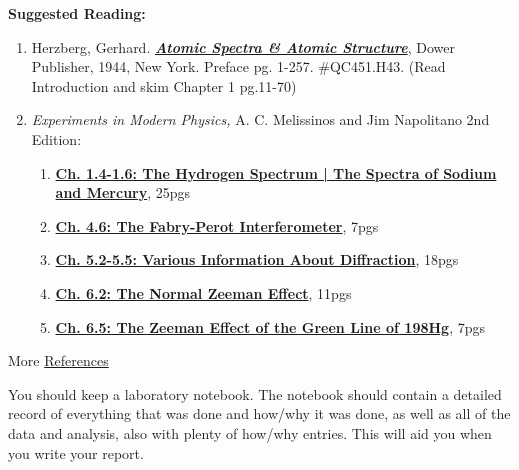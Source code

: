 \documentclass{../lab}
\begin{document}
\noindent\textbf{Suggested Reading:}

\begin{enumerate}
    \item Herzberg, Gerhard. \emph{\href{https://drive.google.com/file/d/1WSyJRwUKQZkj335oLa1WTh3_NwQC4f2T/view?usp=drive_link}{\textbf{Atomic Spectra \& Atomic Structure}}}, Dower Publisher, 1944, New York. Preface pg. 1-257. \#QC451.H43. (Read Introduction and skim Chapter 1 pg.11-70)


    \item\emph{Experiments in Modern Physics,} A. C. Melissinos and Jim Napolitano 2nd Edition:
    
    \begin{enumerate}
        \item \href{https://drive.google.com/file/d/18QFC_Op-xii8O3NMuTpigmJulkBVi6Rb/view?usp=drive_link}{\textbf{Ch. 1.4-1.6: The Hydrogen Spectrum | The Spectra of Sodium and Mercury}}, 25pgs
    
        \item \href{https://drive.google.com/file/d/1OtsGU8RCQSVL5gpf-29cjBacRTTGGvf0/view?usp=drive_link}{\textbf{Ch. 4.6: The Fabry-Perot Interferometer}}, 7pgs
    
        \item \href{https://drive.google.com/file/d/18Ltiqg1ByuwP_YIjoWROVrCrBQgrdnQm/view?usp=drive_link}{\textbf{Ch. 5.2-5.5: Various Information About Diffraction}}, 18pgs
    
        \item \href{https://drive.google.com/file/d/1ZTCvxGWjWa2LlzZUo_YgFbk8t-xO3LBy/view?usp=drive_link}{\textbf{Ch. 6.2: The Normal Zeeman Effect}}, 11pgs
    
        \item \href{https://drive.google.com/file/d/1GhpjxWvfQqXUVwYPoIaDtat9mbd5f0mE/view?usp=drive_link}{\textbf{Ch. 6.5: The Zeeman Effect of the Green Line of 198Hg}}, 7pgs
    
    \end{enumerate}

\end{enumerate}

\noindent More \hyperref[sec:References]{References}

You should keep a laboratory notebook. The notebook should contain a detailed record of everything that was done and how/why it was done, as well as all of the data and analysis, also with plenty of how/why entries. This will aid you when you write your report.
\end{document}
